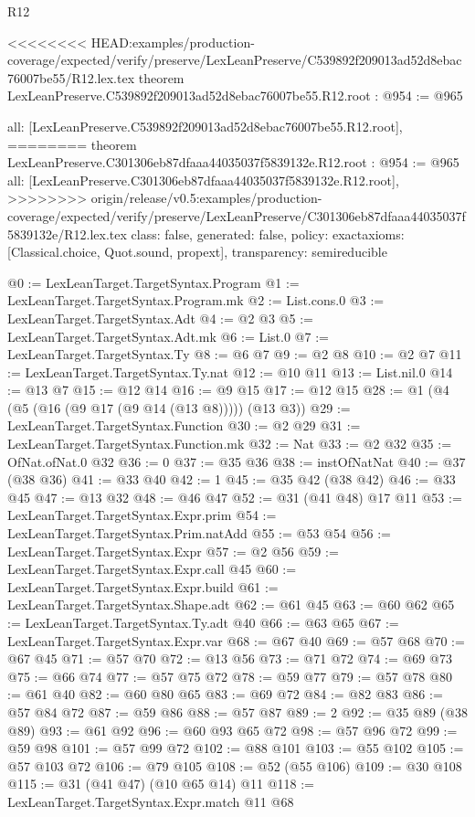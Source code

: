 \begin{lexlean}{R12}
\begin{coremodule}
{{{{{{{{}
<<<<<<<< HEAD:examples/production-coverage/expected/verify/preserve/LexLeanPreserve/C539892f209013ad52d8ebac76007be55/R12.lex.tex
theorem LexLeanPreserve.C539892f209013ad52d8ebac76007be55.R12.root : @954 := @965 {
  all: [LexLeanPreserve.C539892f209013ad52d8ebac76007be55.R12.root],
========
theorem LexLeanPreserve.C301306eb87dfaaa44035037f5839132e.R12.root : @954 := @965 {
  all: [LexLeanPreserve.C301306eb87dfaaa44035037f5839132e.R12.root],
>>>>>>>> origin/release/v0.5:examples/production-coverage/expected/verify/preserve/LexLeanPreserve/C301306eb87dfaaa44035037f5839132e/R12.lex.tex
  class: false,
  generated: false,
  policy: exact{axioms: [Classical.choice, Quot.sound, propext]},
  transparency: semireducible
}

@0 := LexLeanTarget.TargetSyntax.Program
@1 := LexLeanTarget.TargetSyntax.Program.mk
@2 := List.cons.{0}
@3 := LexLeanTarget.TargetSyntax.Adt
@4 := @2 @3
@5 := LexLeanTarget.TargetSyntax.Adt.mk
@6 := List.{0}
@7 := LexLeanTarget.TargetSyntax.Ty
@8 := @6 @7
@9 := @2 @8
@10 := @2 @7
@11 := LexLeanTarget.TargetSyntax.Ty.nat
@12 := @10 @11
@13 := List.nil.{0}
@14 := @13 @7
@15 := @12 @14
@16 := @9 @15
@17 := @12 @15
@28 := @1 (@4 (@5 (@16 (@9 @17 (@9 @14 (@13 @8))))) (@13 @3))
@29 := LexLeanTarget.TargetSyntax.Function
@30 := @2 @29
@31 := LexLeanTarget.TargetSyntax.Function.mk
@32 := Nat
@33 := @2 @32
@35 := OfNat.ofNat.{0} @32
@36 := 0
@37 := @35 @36
@38 := instOfNatNat
@40 := @37 (@38 @36)
@41 := @33 @40
@42 := 1
@45 := @35 @42 (@38 @42)
@46 := @33 @45
@47 := @13 @32
@48 := @46 @47
@52 := @31 (@41 @48) @17 @11
@53 := LexLeanTarget.TargetSyntax.Expr.prim
@54 := LexLeanTarget.TargetSyntax.Prim.natAdd
@55 := @53 @54
@56 := LexLeanTarget.TargetSyntax.Expr
@57 := @2 @56
@59 := LexLeanTarget.TargetSyntax.Expr.call @45
@60 := LexLeanTarget.TargetSyntax.Expr.build
@61 := LexLeanTarget.TargetSyntax.Shape.adt
@62 := @61 @45
@63 := @60 @62
@65 := LexLeanTarget.TargetSyntax.Ty.adt @40
@66 := @63 @65
@67 := LexLeanTarget.TargetSyntax.Expr.var
@68 := @67 @40
@69 := @57 @68
@70 := @67 @45
@71 := @57 @70
@72 := @13 @56
@73 := @71 @72
@74 := @69 @73
@75 := @66 @74
@77 := @57 @75 @72
@78 := @59 @77
@79 := @57 @78
@80 := @61 @40
@82 := @60 @80 @65
@83 := @69 @72
@84 := @82 @83
@86 := @57 @84 @72
@87 := @59 @86
@88 := @57 @87
@89 := 2
@92 := @35 @89 (@38 @89)
@93 := @61 @92
@96 := @60 @93 @65 @72
@98 := @57 @96 @72
@99 := @59 @98
@101 := @57 @99 @72
@102 := @88 @101
@103 := @55 @102
@105 := @57 @103 @72
@106 := @79 @105
@108 := @52 (@55 @106)
@109 := @30 @108
@115 := @31 (@41 @47) (@10 @65 @14) @11
@118 := LexLeanTarget.TargetSyntax.Expr.match @11 @68
}}}}}}}}
\end{coremodule}
\end{lexlean}
